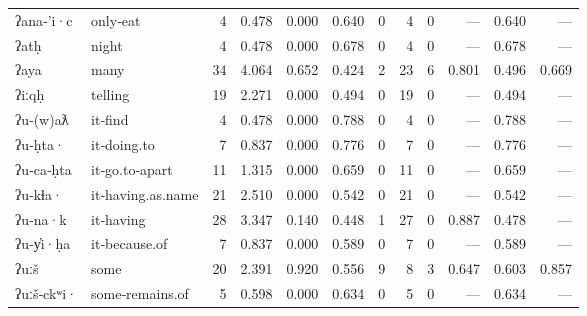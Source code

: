 \begin{landscape}
\begin{longtable}[c]{ l l | r r c c | r r r | r r r }
  ʔana‑'i·c          & only‑eat                  & 4   & 0.478                     & 0.000           & 0.640      & 0         & 4           & 0            & —         & 0.640       & —\\
  ʔatḥ               & night                     & 4   & 0.478                     & 0.000           & 0.678      & 0         & 4           & 0            & —         & 0.678       & —\\
  ʔaya               & many                      & 34  & 4.064                     & 0.652           & 0.424      & 2         & 23          & 6            & 0.801     & 0.496       & 0.669\\
  ʔiːqḥ              & telling                   & 19  & 2.271                     & 0.000           & 0.494      & 0         & 19          & 0            & —         & 0.494       & —\\
  ʔu‑(w)aƛ           & it‑find                   & 4   & 0.478                     & 0.000           & 0.788      & 0         & 4           & 0            & —         & 0.788       & —\\
  ʔu‑ḥta·            & it‑doing.to               & 7   & 0.837                     & 0.000           & 0.776      & 0         & 7           & 0            & —         & 0.776       & —\\
  ʔu‑ca‑ḥta          & it‑go.to‑apart            & 11  & 1.315                     & 0.000           & 0.659      & 0         & 11          & 0            & —         & 0.659       & —\\
  ʔu‑kɬa·            & it‑having.as.name         & 21  & 2.510                     & 0.000           & 0.542      & 0         & 21          & 0            & —         & 0.542       & —\\
  ʔu‑na·k            & it‑having                 & 28  & 3.347                     & 0.140           & 0.448      & 1         & 27          & 0            & 0.887     & 0.478       & —\\
  ʔu‑y̓i·ḥa           & it‑because.of             & 7   & 0.837                     & 0.000           & 0.589      & 0         & 7           & 0            & —         & 0.589       & —\\
  ʔuːš               & some                      & 20  & 2.391                     & 0.920           & 0.556      & 9         & 8           & 3            & 0.647     & 0.603       & 0.857\\
  ʔuːš‑ckʷi·         & some‑remains.of           & 5   & 0.598                     & 0.000           & 0.634      & 0         & 5           & 0            & —         & 0.634       & —\\

\end{longtable}
\end{landscape}
